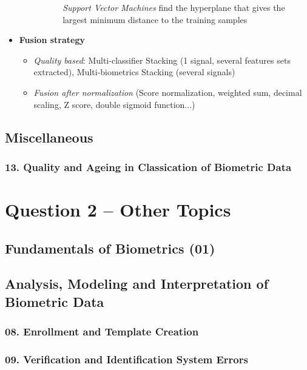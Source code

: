 \documentclass[a4paper]{article}
\begin{document}
\begin{itemize}
\begin{itemize}
\begin{itemize}
\begin{itemize}
                \emph{Support Vector Machines} find the hyperplane that gives the largest minimum distance to the training samples
              \end{itemize}
            \end{itemize}
          \end{itemize}
          \item \textbf{Fusion strategy}
          \begin{itemize}
            \item \emph{Quality based}: Multi-classifier Stacking (1 signal, several features sets extracted), Multi-biometrics Stacking (several signals)
            \item \emph{Fusion after normalization} (Score normalization, weighted sum, decimal scaling, Z score, double sigmoid function...)
          \end{itemize}
        \end{itemize}
  \subsection*{Miscellaneous}
    \subsubsection*{13. Quality and Ageing in Classication of Biometric Data}

\newpage

\section*{Question 2 -- Other Topics} %
\label{sec:question_2_other_topics}
  \subsection*{Fundamentals of Biometrics (01)}
    
  \subsection*{Analysis, Modeling and Interpretation of Biometric Data}
    
    \subsubsection*{08. Enrollment and Template Creation}
    \subsubsection*{09. Verification and Identification System Errors}
\end{document}
